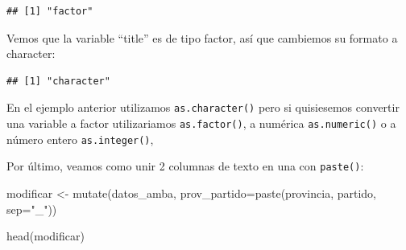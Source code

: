 \documentclass[
  spanish,
]{book}
\newenvironment{Shaded}{\begin{snugshade}}{\end{snugshade}}
\newcommand{\AttributeTok}[1]{\textcolor[rgb]{0.77,0.63,0.00}{#1}}
\newcommand{\FunctionTok}[1]{\textcolor[rgb]{0.00,0.00,0.00}{#1}}
\newcommand{\NormalTok}[1]{#1}
\newcommand{\OtherTok}[1]{\textcolor[rgb]{0.56,0.35,0.01}{#1}}
\newcommand{\SpecialCharTok}[1]{\textcolor[rgb]{0.00,0.00,0.00}{#1}}
\newcommand{\StringTok}[1]{\textcolor[rgb]{0.31,0.60,0.02}{#1}}
\begin{document}
\begin{verbatim}
## [1] "factor"
\end{verbatim}

Vemos que la variable ``title'' es de tipo factor, así que cambiemos su formato a character:

\begin{Shaded}
\end{Shaded}

\begin{verbatim}
## [1] "character"
\end{verbatim}

En el ejemplo anterior utilizamos \texttt{as.character()} pero si quisiesemos convertir una variable a factor utilizariamos \texttt{as.factor()}, a numérica \texttt{as.numeric()} o a número entero \texttt{as.integer()},

Por último, veamos como unir 2 columnas de texto en una con \texttt{paste()}:

\begin{Shaded}
\begin{Highlighting}[]
\NormalTok{modificar }\OtherTok{\textless{}{-}} \FunctionTok{mutate}\NormalTok{(datos\_amba, }\AttributeTok{prov\_partido=}\FunctionTok{paste}\NormalTok{(provincia, partido, }\AttributeTok{sep=}\StringTok{"\_"}\NormalTok{))}

\FunctionTok{head}\NormalTok{(modificar)}
\end{Highlighting}
\end{Shaded}
\end{document}
